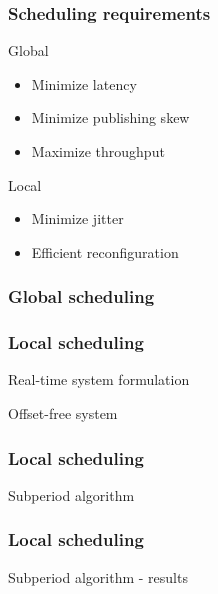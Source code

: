 \documentclass[]{prezentare}
\begin{document}
\begin{frame}
	\frametitle{Scheduling requirements}
	\begin{block}{Global}
		\begin{itemize}
			\item Minimize latency
			\item Minimize publishing skew
			\item Maximize throughput
		\end{itemize}
	\end{block}

	\begin{block}{Local}
		\begin{itemize}
			\item Minimize jitter
			\item Efficient reconfiguration
		\end{itemize}
	\end{block}
\end{frame}
\begin{frame}
	\frametitle{Global scheduling}
	\begin{block}
	
	\end{block}
\end{frame}
\begin{frame}
	\frametitle{Local scheduling}
	\begin{block}{Real-time system formulation}
	
	\end{block}
	\begin{block}{Offset-free system}
	
	\end{block}
\end{frame}
\begin{frame}
	\frametitle{Local scheduling}
	\begin{block}{Subperiod algorithm}
		
	\end{block}
\end{frame}
\begin{frame}
	\frametitle{Local scheduling}
	\begin{block}{Subperiod algorithm - results}
	
	\end{block}
\end{frame}
\end{document}
